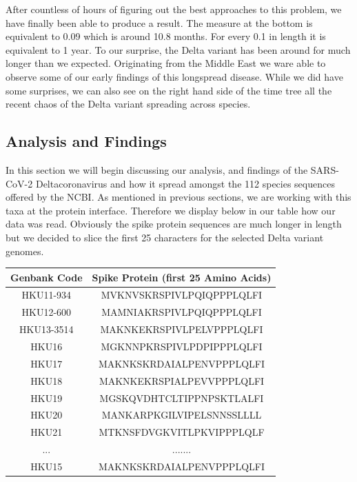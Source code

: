 After countless of hours of figuring out the best approaches to this problem, we have finally been able to produce a result.
The measure at the bottom is equivalent to 0.09 which is around 10.8 months. For every 0.1 in length it is equivalent to 1 year. 
To our surprise, the Delta variant has been around for much longer than we expected. Originating from the Middle East we ware able to observe some of our early findings of this longspread disease. 
While we did have some surprises, we can also see on the right hand side of the time tree all the recent chaos of the Delta variant spreading across species.

\subsection{Analysis and Findings}

In this section we will begin discussing our analysis, and findings of the SARS-CoV-2 Deltacoronavirus and how it spread amongst the 112 species sequences offered by the NCBI. As mentioned in previous sections, we are working with this taxa at the protein interface. Therefore we display below in our table how our data was read. Obviously the spike protein sequences are much longer in length but we decided to slice the first 25 characters for the selected Delta variant genomes.  

\begin{center}
\begin{tabular}{||c | c||} 
 \hline
 Genbank Code & Spike Protein (first 25 Amino Acids) \\
 \hline\hline
 HKU11-934 & MVKNVSKRSPIVLPQIQPPPLQLFI \\  
 \hline
 HKU12-600 & MAMNIAKRSPIVLPQIQPPPLQLFI \\ 
 \hline
 HKU13-3514 & MAKNKEKRSPIVLPELVPPPLQLFI \\
 \hline
 HKU16 & MGKNNPKRSPIVLPDPIPPPLQLFI \\
 \hline
 HKU17 & MAKNKSKRDAIALPENVPPPLQLFI \\
 \hline
 HKU18 & MAKNKEKRSPIALPEVVPPPLQLFI \\  
 \hline
 HKU19 & MGSKQVDHTCLTIPPNPSKTLALFI \\ 
 \hline
 HKU20 & MANKARPKGILVIPELSNNSSLLLL \\ 
 \hline
 HKU21 & MTKNSFDVGKVITLPKVIPPPLQLF \\ 
 \hline
 ... & .......				\\
\hline
 HKU15 & MAKNKSKRDAIALPENVPPPLQLFI \\ 
 \hline
\end{tabular}
\end{center}

